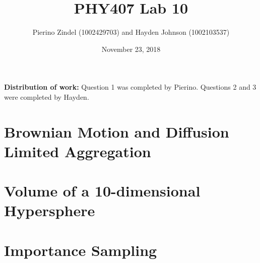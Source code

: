 \documentclass{article}
\title{PHY407 Lab 10}
\author{Pierino Zindel (1002429703) and Hayden Johnson (1002103537)}
\date{November 23, 2018}
\begin{document}
\maketitle

\noindent \textbf{Distribution of work:} Question 1 was completed by Pierino. Questions 2 and 3 were completed by Hayden.

\section{Brownian Motion and Diffusion Limited Aggregation}

\section{Volume of a 10-dimensional Hypersphere}

\section{Importance Sampling}
\end{document}
